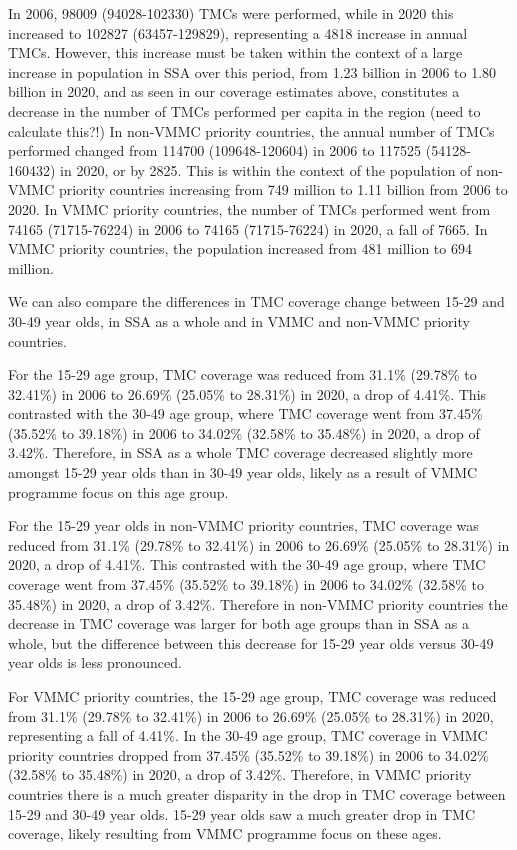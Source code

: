 \documentclass{article}
\begin{document}
In 2006, 98009 (94028-102330) TMCs were performed, while in 2020 this increased to 102827 (63457-129829), representing a 4818 increase in annual TMCs. However, this increase must be taken within the context of a large increase in population in SSA over this period, from 1.23 billion in 2006 to 1.80 billion in 2020, and as seen in our coverage estimates above, constitutes a decrease in the number of TMCs performed per capita in the region (need to calculate this?!) In non-VMMC priority countries, the annual number of TMCs performed changed from 114700 (109648-120604) in 2006 to 117525 (54128-160432) in 2020, or by 2825. This is within the context of the population of non-VMMC priority countries increasing from 749 million to 1.11 billion from 2006 to 2020. In VMMC priority countries, the number of TMCs performed went from 74165 (71715-76224) in 2006 to 74165 (71715-76224) in 2020, a fall of 7665. In VMMC priority countries, the population increased from 481 million to 694 million. 

We can also compare the differences in TMC coverage change between 15-29 and 30-49 year olds, in SSA as a whole and in VMMC and non-VMMC priority countries.

For the 15-29 age group, TMC coverage was reduced from 31.1\% (29.78\% to 32.41\%) in 2006 to 26.69\% (25.05\% to 28.31\%) in 2020, a drop of 4.41\%. This contrasted with the 30-49 age group, where TMC coverage went from 37.45\% (35.52\% to 39.18\%) in 2006 to 34.02\% (32.58\% to 35.48\%) in 2020, a drop of 3.42\%. Therefore, in SSA as a whole TMC coverage decreased slightly more amongst 15-29 year olds than in 30-49 year olds, likely as a result of VMMC programme focus on this age group.

For the 15-29 year olds in non-VMMC priority countries, TMC coverage was reduced from 31.1\% (29.78\% to 32.41\%) in 2006 to 26.69\% (25.05\% to 28.31\%) in 2020, a drop of 4.41\%. This contrasted with the 30-49 age group, where TMC coverage went from 37.45\% (35.52\% to 39.18\%) in 2006 to 34.02\% (32.58\% to 35.48\%) in 2020, a drop of 3.42\%. Therefore in non-VMMC priority countries the decrease in TMC coverage was larger for both age groups than in SSA as a whole, but the difference between this decrease for 15-29 year olds versus 30-49 year olds is less pronounced.

For VMMC priority countries, the 15-29 age group, TMC coverage was reduced from 31.1\% (29.78\% to 32.41\%) in 2006 to 26.69\% (25.05\% to 28.31\%) in 2020, representing a fall of 4.41\%. In the 30-49 age group, TMC coverage in VMMC priority countries dropped from 37.45\% (35.52\% to 39.18\%) in 2006 to 34.02\% (32.58\% to 35.48\%) in 2020, a drop of 3.42\%. Therefore, in VMMC priority countries there is a much greater disparity in the drop in TMC coverage between 15-29 and 30-49 year olds. 15-29 year olds saw a much greater drop in TMC coverage, likely resulting from VMMC programme focus on these ages.
\end{document}
